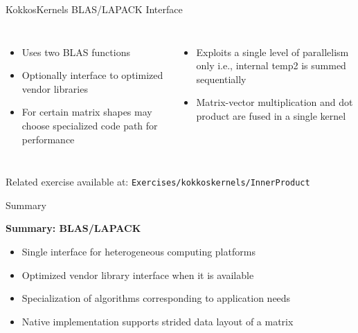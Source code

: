 \begin{frame}[fragile]{KokkosKernels BLAS/LAPACK Interface}
\vspace{-0.5em}
  \begin{columns}[t,onlytextwidth]
      \begin{itemize}
        \vspace{-1em}
        \item{\scriptsize{Uses two BLAS functions}}
        \item{\scriptsize{Optionally interface to optimized vendor libraries}}
        \item{\scriptsize{For certain matrix shapes may choose specialized code path for performance}}
      \end{itemize}
      \begin{itemize}
        \vspace{-1em}
        \item{\scriptsize{Exploits a single level of parallelism only i.e., internal temp2 is summed sequentially}}
        \item{\scriptsize{Matrix-vector multiplication and dot product are fused in a single kernel}}
      \end{itemize}
  \end{columns}
\vspace{0.5em}
\scriptsize{Related exercise available at: \verb!Exercises/kokkoskernels/InnerProduct!}

\end{frame}

\begin{frame}[fragile]{Summary}

  \textbf{Summary: BLAS/LAPACK}
  \begin{itemize}
  \item \small{Single interface for heterogeneous computing platforms}
  \item \small{Optimized vendor library interface when it is available}
  \item \small{Specialization of algorithms corresponding to application needs}
  \item \small{Native implementation supports strided data layout of a matrix}
  \end{itemize}
  
\end{frame}

